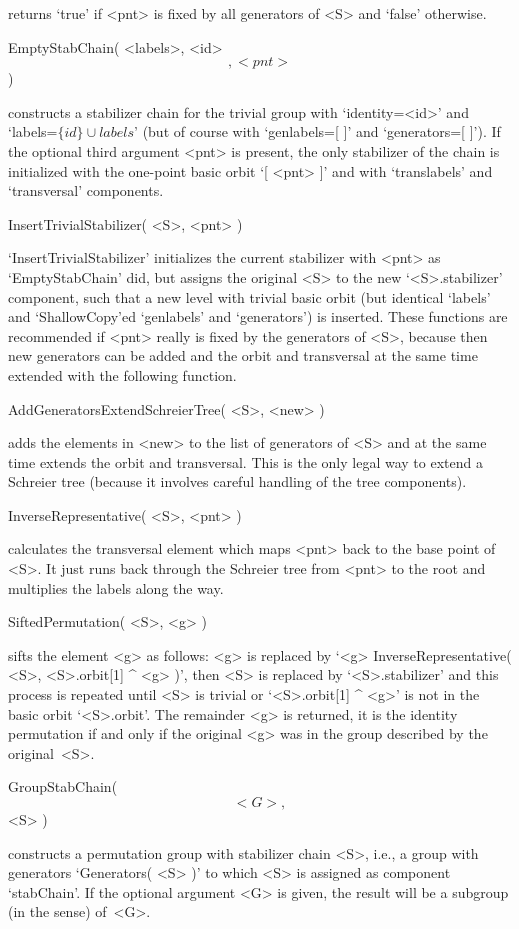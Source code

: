 returns `true'  if <pnt> is fixed by   all generators of  <S> and
`false' otherwise.

\>EmptyStabChain( <labels>, <id> \[, <pnt> \] )

constructs  a   stabilizer  chain  for   the trivial   group with
`identity=<id>' and `labels=$\{id\}\cup  labels$'  (but of course
with `genlabels=[ ]' and `generators=[ ]'). If the optional third
argument <pnt>  is present, the only stabilizer   of the chain is
initialized with the  one-point basic orbit  `[ <pnt> ]' and with
`translabels' and `transversal' components.

\>InsertTrivialStabilizer( <S>, <pnt> )

`InsertTrivialStabilizer' initializes the current stabilizer with
<pnt>  as `EmptyStabChain' did,  but  assigns the original <S> to
the  new `<S>.stabilizer' component,  such that  a new level with
trivial basic  orbit (but identical  `labels' and `ShallowCopy'ed
`genlabels' and  `generators') is  inserted. These functions  are
recommended if <pnt> really is  fixed  by the generators of  <S>,
because   then new generators  can   be added and  the  orbit and
transversal   at the  same   time  extended  with  the  following
function.

\>AddGeneratorsExtendSchreierTree( <S>, <new> )

adds the elements  in <new> to the list  of generators of <S> and
at the  same time extends the  orbit and transversal. This is the
only legal way  to extend  a  Schreier tree (because  it involves
careful handling of the tree components).

\>InverseRepresentative( <S>, <pnt> )

calculates the transversal element which  maps <pnt> back to  the
base point of  <S>. It just  runs back through the  Schreier tree
from <pnt> to the root and multiplies the labels along the way.

\>SiftedPermutation( <S>, <g> )

sifts  the element  <g> as  follows: <g>  is replaced by  `<g> \*
InverseRepresentative(  <S>, <S>.orbit[1] ^   <g> )', then <S> is
replaced by `<S>.stabilizer' and  this process is repeated  until
<S> is trivial or `<S>.orbit[1] ^ <g>' is  not in the basic orbit
`<S>.orbit'.  The remainder <g>  is returned, it  is the identity
permutation if  and  only if the  original <g>  was in  the group
described by the original~<S>.

\>GroupStabChain( \[ <G>, \] <S> )

constructs a permutation group with stabilizer chain <S>, i.e., a
group    with  generators `Generators( <S>  )'   to  which <S> is
assigned as component  `stabChain'. If the  optional argument <G>
is  given, the result  will be  a subgroup (in  the {\GAP} sense)
of~<G>.

